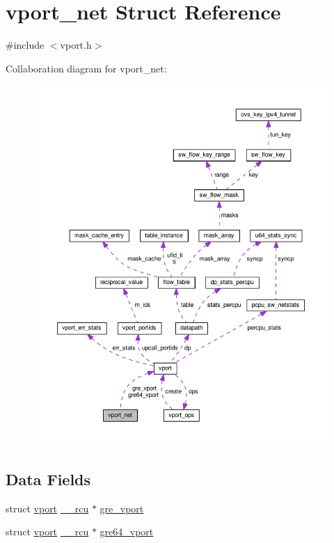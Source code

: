 \hypertarget{structvport__net}{}\section{vport\+\_\+net Struct Reference}
\label{structvport__net}


{\ttfamily \#include $<$vport.\+h$>$}



Collaboration diagram for vport\+\_\+net\+:
\nopagebreak
\begin{figure}[H]
\begin{center}
\leavevmode
\includegraphics[width=350pt]{structvport__net__coll__graph}
\end{center}
\end{figure}
\subsection*{Data Fields}
\begin{DoxyCompactItemize}
\item 
struct \hyperlink{structvport}{vport} \hyperlink{compiler_8h_a2b3b0c016258969e4b39c66b6eec2129}{\+\_\+\+\_\+rcu} $\ast$ \hyperlink{structvport__net_a25768f1cf01f5e719b93818fddc5c528}{gre\+\_\+vport}
\item 
struct \hyperlink{structvport}{vport} \hyperlink{compiler_8h_a2b3b0c016258969e4b39c66b6eec2129}{\+\_\+\+\_\+rcu} $\ast$ \hyperlink{structvport__net_ac907ad528610a5eb24f9889a51d23265}{gre64\+\_\+vport}
\end{DoxyCompactItemize}


